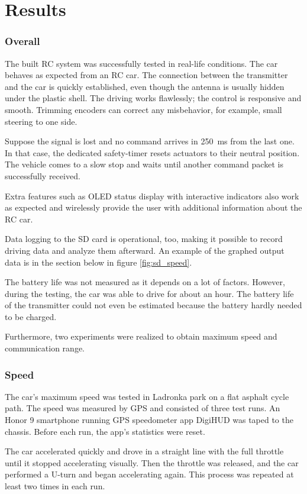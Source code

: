 


\part{Results}
\label{chap:results}
\section{Overall}
The built RC system was successfully tested in real-life conditions. The car behaves as expected from an RC car. The connection between the transmitter and the car is quickly established, even though the antenna is usually hidden under the plastic shell. The driving works flawlessly; the control is responsive and smooth. Trimming encoders can correct any misbehavior, for example, small steering to one side.

Suppose the signal is lost and no command arrives in \SI{250}{\ms} from the last one. In that case, the dedicated safety-timer resets actuators to their neutral position. The vehicle comes to a slow stop and waits until another command packet is successfully received.

Extra features such as OLED status display with interactive indicators also work as expected and wirelessly provide the user with additional information about the RC car.

Data logging to the SD card is operational, too, making it possible to record driving data and analyze them afterward. An example of the graphed output data is in the section below in figure \ref{fig:sd_speed}.

The battery life was not measured as it depends on a lot of factors. However, during the testing, the car was able to drive for about an hour. The battery life of the transmitter could not even be estimated because the battery hardly needed to be charged.

Furthermore, two experiments were realized to obtain maximum speed and communication range.

\section{Speed}
The car's maximum speed was tested in Ladronka park on a flat asphalt cycle path. The speed was measured by GPS and consisted of three test runs. An Honor 9 smartphone running GPS speedometer app DigiHUD was taped to the chassis. Before each run, the app's statistics were reset.

The car accelerated quickly and drove in a straight line with the full throttle until it stopped accelerating visually. Then the throttle was released, and the car performed a U-turn and began accelerating again. This process was repeated at least two times in each run.

